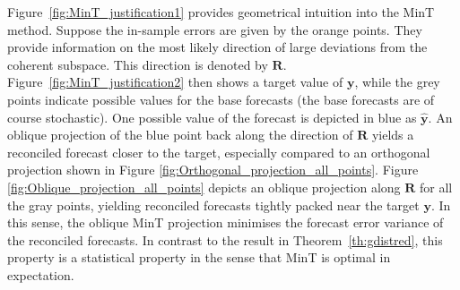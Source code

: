 \documentclass[12pt]{article}
\theoremstyle{definition}
\theoremstyle{property}
\begin{document}
	
	Figure~\ref{fig:MinT_justification1} provides geometrical intuition into the MinT method.  Suppose the in-sample errors are given by the orange points.  They provide information on the most likely direction of large deviations from the coherent subspace.  This direction is denoted by $\bm{R}$.  Figure~\ref{fig:MinT_justification2} then shows a target value of $\bm{y}$, while the grey points indicate possible values for the base forecasts (the base forecasts are of course stochastic).  One possible value of the forecast is depicted in blue as $\hat{\bm{y}}$.  An oblique projection of the blue point back along the direction of $\bm{R}$ yields a reconciled forecast closer to the target, especially compared to an orthogonal projection shown in Figure \ref{fig:Orthogonal_projection_all_points}.  Figure \ref{fig:Oblique_projection_all_points} depicts an oblique projection along $\bm{R}$ for all the gray points, yielding reconciled forecasts tightly packed near the target $\bm{y}$.  In this sense, the oblique MinT projection minimises the forecast error variance of the reconciled forecasts. In contrast to the result in Theorem~\ref{th:gdistred}, this property is a statistical property in the sense that MinT is optimal in expectation.
	
\end{document}
